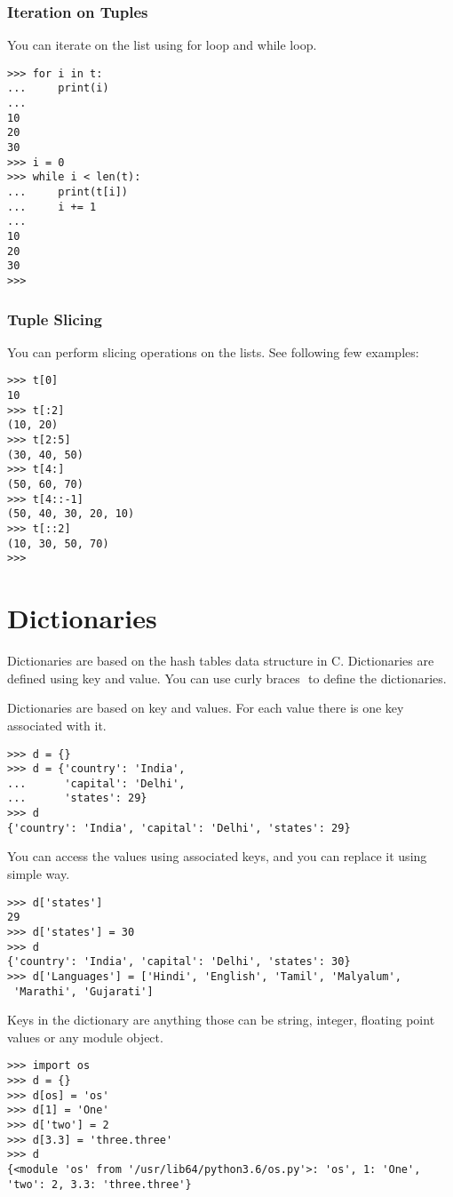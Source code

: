\documentclass[letterpaper,12pt]{book}
\begin{document}
\subsubsection{Iteration on Tuples}
You can iterate on the list using for loop and while loop.
\begin{lstlisting}
>>> for i in t:
...     print(i)
... 
10
20
30
>>> i = 0
>>> while i < len(t):
...     print(t[i])
...     i += 1
... 
10
20
30
>>> 
\end{lstlisting}
\subsubsection{Tuple Slicing}
You can perform slicing operations on the lists. See following few examples:
\begin{lstlisting}
>>> t[0]
10
>>> t[:2]
(10, 20)
>>> t[2:5]
(30, 40, 50)
>>> t[4:]
(50, 60, 70)
>>> t[4::-1]
(50, 40, 30, 20, 10)
>>> t[::2]
(10, 30, 50, 70)
>>> 
\end{lstlisting}
\section{Dictionaries}
Dictionaries are based on the hash tables data structure in C. Dictionaries are defined using key and value. You can use curly braces ${}$ to define the dictionaries.

Dictionaries are based on key and values. For each value there is one  key associated with it. 
\begin{lstlisting}
>>> d = {}
>>> d = {'country': 'India', 
...      'capital': 'Delhi', 
...      'states': 29}
>>> d
{'country': 'India', 'capital': 'Delhi', 'states': 29}
\end{lstlisting}
You can access the values using associated keys, and you can replace it using simple way.
\begin{lstlisting}
>>> d['states']
29
>>> d['states'] = 30
>>> d
{'country': 'India', 'capital': 'Delhi', 'states': 30}
>>> d['Languages'] = ['Hindi', 'English', 'Tamil', 'Malyalum',
 'Marathi', 'Gujarati']

\end{lstlisting}
Keys in the dictionary are anything those can be string, integer, floating point values or any module object. 
\begin{lstlisting}
>>> import os
>>> d = {}
>>> d[os] = 'os'
>>> d[1] = 'One'
>>> d['two'] = 2
>>> d[3.3] = 'three.three'
>>> d
{<module 'os' from '/usr/lib64/python3.6/os.py'>: 'os', 1: 'One', 'two': 2, 3.3: 'three.three'}
\end{lstlisting}
\end{document}
